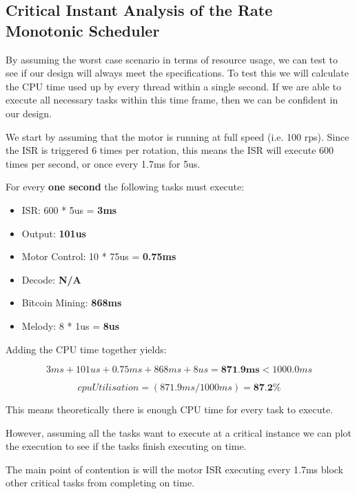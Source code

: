 \documentclass{article}
\begin{document}
\subsection{Critical Instant Analysis of the Rate Monotonic Scheduler}

\noindent
By assuming the worst case scenario in terms of resource usage, we can test to see if our design will always meet the specifications.
To test this we will calculate the CPU time used up by every thread within a single second. If we are able to execute all necessary tasks within this time frame, then we can be confident in our design.

\bigskip

\noindent
We start by assuming that the motor is running at full speed (i.e. 100 rps). Since the ISR is triggered 6 times per rotation, this means the ISR will execute 600 times per second, or once every 1.7ms for 5us.

\bigskip

\noindent
For every \textbf{one second} the following tasks must execute:
\begin{itemize}
     \item ISR: 600 * 5us = \textbf{3ms}
     \item Output: \textbf{101us}
     \item Motor Control: 10 * 75us = \textbf{0.75ms}
     \item Decode: \textbf{N/A}
     \item Bitcoin Mining: \textbf{868ms}
     \item Melody: 8 * 1us = \textbf{8us}
   \end{itemize}

\noindent
Adding the CPU time together yields:

\[3ms + 101us + 0.75ms + 868ms + 8us = \textbf{871.9ms} < 1000.0ms\]

\[cpuUtilisation = (871.9 ms / 1000 ms) = \textbf{87.2\%}\]

\bigskip

\noindent
This means theoretically there is enough CPU time for every task to execute.

\bigskip

\noindent
However, assuming all the tasks want to execute at a critical instance we can plot the execution to see if the tasks finish executing on time.

\bigskip

\noindent
The main point of contention is will the motor ISR executing every 1.7ms block other critical tasks from completing on time.
\end{document}
